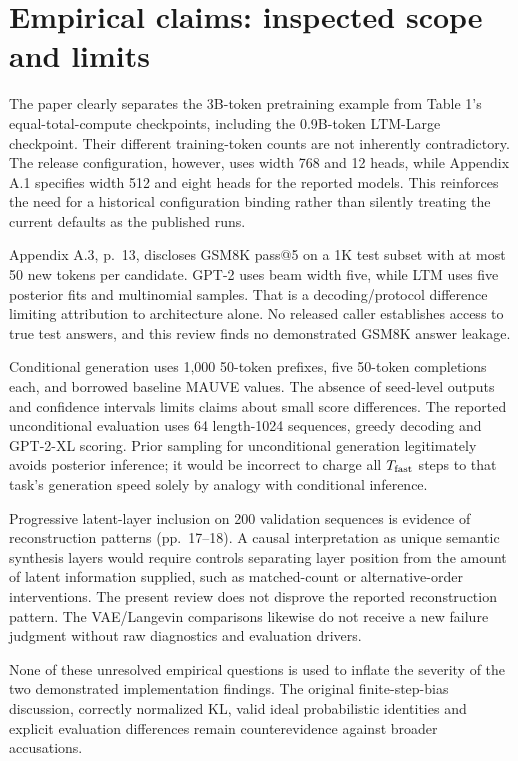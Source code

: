 \documentclass[10pt]{article}
\begin{document}
\section*{Empirical claims: inspected scope and limits}
The paper clearly separates the 3B-token pretraining example from Table 1’s equal-total-compute checkpoints, including the 0.9B-token LTM-Large checkpoint. Their different training-token counts are not inherently contradictory. The release configuration, however, uses width 768 and 12 heads, while Appendix A.1 specifies width 512 and eight heads for the reported models. This reinforces the need for a historical configuration binding rather than silently treating the current defaults as the published runs.\par
Appendix A.3, p. 13, discloses GSM8K pass@5 on a 1K test subset with at most 50 new tokens per candidate. GPT-2 uses beam width five, while LTM uses five posterior fits and multinomial samples. That is a decoding/protocol difference limiting attribution to architecture alone. No released caller establishes access to true test answers, and this review finds no demonstrated GSM8K answer leakage.\par
Conditional generation uses 1,000 50-token prefixes, five 50-token completions each, and borrowed baseline MAUVE values. The absence of seed-level outputs and confidence intervals limits claims about small score differences. The reported unconditional evaluation uses 64 length-1024 sequences, greedy decoding and GPT-2-XL scoring. Prior sampling for unconditional generation legitimately avoids posterior inference; it would be incorrect to charge all \(T_{\rm fast}\) steps to that task’s generation speed solely by analogy with conditional inference.\par
Progressive latent-layer inclusion on 200 validation sequences is evidence of reconstruction patterns (pp. 17–18). A causal interpretation as unique semantic synthesis layers would require controls separating layer position from the amount of latent information supplied, such as matched-count or alternative-order interventions. The present review does not disprove the reported reconstruction pattern. The VAE/Langevin comparisons likewise do not receive a new failure judgment without raw diagnostics and evaluation drivers.\par
None of these unresolved empirical questions is used to inflate the severity of the two demonstrated implementation findings. The original finite-step-bias discussion, correctly normalized KL, valid ideal probabilistic identities and explicit evaluation differences remain counterevidence against broader accusations.\par
\end{document}
